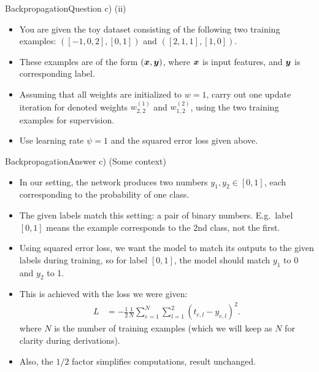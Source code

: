 \documentclass[t]{beamer}
\begin{document}
\begin{frame}{Backpropagation}{Question c) (ii)}
    \begin{itemize}
        \item You are given the toy dataset consisting of the following
              two training examples: $([-1, 0, 2], [0, 1])$ and
              $([2, 1, 1], [1, 0])$.
        \item These examples are of the form $({\boldsymbol{x}}, {\boldsymbol{y}})$, where ${\boldsymbol{x}}$
              is input features, and ${\boldsymbol{y}}$ is corresponding label.
        \item Assuming that all weights are initialized to $w = 1$, carry
              out one update iteration for denoted weights $w^{(1)}_{2,2}$
              and $w^{(2)}_{1,2}$, using the two training examples for
              supervision.
        \item Use learning rate $\psi = 1$ and the squared error
              loss given above.
    \end{itemize}
\end{frame}

\begin{frame}{Backpropagation}{Answer c) (Some context)}
    \begin{itemize}
        \item In our setting, the network produces two numbers
              $y_1,y_2\in [0,1]$, each corresponding to the probability of one
              class.
        \item The given labels match this setting: a pair of binary numbers.
              E.g.\ label $[0,1]$ means the example corresponds to the 2nd
              class, not the first.
        \item Using squared error loss, we want the model to match its outputs
              to the given labels during training, so for label $[0,1]$, the
              model should match $y_1$ to 0 and $y_2$ to 1.
        \item This is achieved with the loss we were given:
              \begin{align*}
                  L & = -\frac{1}{2}\frac{1}{N}\sum_{e=1}^{N} \sum_{l=1}^{2} (t_{e,l}-y_{e,l})^2.
              \end{align*}
              where $N$ is the number of training examples (which we will keep
              as $N$ for clarity during derivations).
        \item Also, the $1/2$ factor simplifies computations, result unchanged.
    \end{itemize}
\end{frame}
\end{document}
